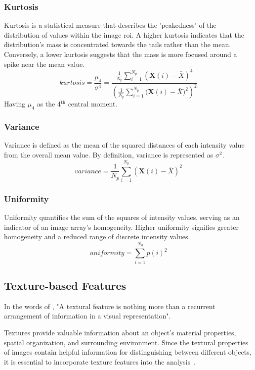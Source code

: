 \subsubsection*{Kurtosis}
Kurtosis is a statistical measure that describes the 'peakedness' of the distribution of values within the image \ac{roi}. A higher kurtosis indicates that the distribution's mass is concentrated towards the tails rather than the mean. Conversely, a lower kurtosis suggests that the mass is more focused around a spike near the mean value.
\begin{equation}
    \textit{kurtosis} = \displaystyle\frac{\mu_4}{\sigma^4} =
        \frac{\frac{1}{N_p}\sum^{N_p}_{i=1}{(\textbf{X}(i)-\bar{X})^4}}
        {\left(\frac{1}{N_p}\sum^{N_p}_{i=1}{(\textbf{X}(i)-\bar{X}})^2\right)^2}
\end{equation}
Having $\mu_4$ as the 4$^{\text{th}}$ central moment.
\subsubsection*{Variance}
Variance is defined as the mean of the squared distances of each intensity value from the overall mean value. By definition, variance is represented as $\sigma^2$.
\begin{equation}
    \textit{variance} = \frac{1}{N_p}\displaystyle\sum^{N_p}_{i=1}{(\textbf{X}(i)-\bar{X})^2}
\end{equation}

\subsubsection*{Uniformity}
Uniformity quantifies the sum of the squares of intensity values, serving as an indicator of an image array's homogeneity. Higher uniformity signifies greater homogeneity and a reduced range of discrete intensity values.
\begin{equation}
    \textit{uniformity} = \displaystyle\sum^{N_g}_{i=1}{p(i)^2}
\end{equation}


\subsection{Texture-based Features}
In the words of \textcite{kaur_review_2021}, "A textural feature is nothing more than a recurrent arrangement of information in a visual representation". 

Textures provide valuable information about an object's material properties, spatial organization, and surrounding environment.
Since the textural properties of images contain helpful information for distinguishing between different objects, it is essential to incorporate texture features into the analysis~\cite{haralick_textural_1973}.

